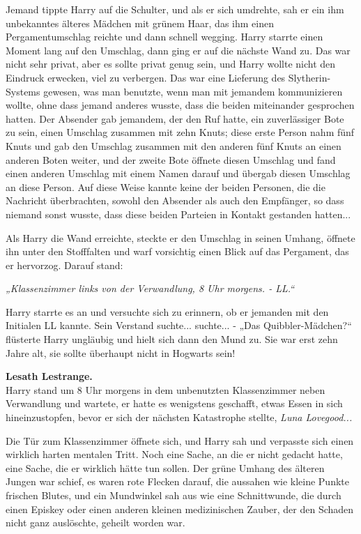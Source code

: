 {Jemand tippte Harry auf die Schulter, und als er sich umdrehte, sah er ein ihm unbekanntes älteres Mädchen mit grünem Haar, das ihm einen Pergamentumschlag reichte und dann schnell wegging. Harry starrte einen Moment lang auf den Umschlag, dann ging er auf die nächste Wand zu. Das war nicht sehr privat, aber es sollte privat genug sein, und Harry wollte nicht den Eindruck erwecken, viel zu verbergen. Das war eine Lieferung des Slytherin-Systems gewesen, was man benutzte, wenn man mit jemandem kommunizieren wollte, ohne dass jemand anderes wusste, dass die beiden miteinander gesprochen hatten. Der Absender gab jemandem, der den Ruf hatte, ein zuverlässiger Bote zu sein, einen Umschlag zusammen mit zehn Knuts; diese erste Person nahm fünf Knuts und gab den Umschlag zusammen mit den anderen fünf Knuts an einen anderen Boten weiter, und der zweite Bote öffnete diesen Umschlag und fand einen anderen Umschlag mit einem Namen darauf und übergab diesen Umschlag an diese Person. Auf diese Weise kannte keine der beiden Personen, die die Nachricht überbrachten, sowohl den Absender als auch den Empfänger, so dass niemand sonst wusste, dass diese beiden Parteien in Kontakt gestanden hatten...

Als Harry die Wand erreichte, steckte er den Umschlag in seinen Umhang, öffnete ihn unter den Stofffalten und warf vorsichtig einen Blick auf das Pergament, das er hervorzog. Darauf stand:

\emph{„Klassenzimmer links von der Verwandlung, 8 Uhr morgens. - LL.“}

Harry starrte es an und versuchte sich zu erinnern, ob er jemanden mit den Initialen LL kannte. Sein Verstand suchte... suchte... - „Das Quibbler-Mädchen?“ flüsterte Harry ungläubig und hielt sich dann den Mund zu. Sie war erst zehn Jahre alt, sie sollte überhaupt nicht in Hogwarts sein!

\textbf{Lesath Lestrange.}\\ Harry stand um 8 Uhr morgens in dem unbenutzten Klassenzimmer neben Verwandlung und wartete, er hatte es wenigstens geschafft, etwas Essen in sich hineinzustopfen, bevor er sich der nächsten Katastrophe stellte, \emph{Luna Lovegood...}

Die Tür zum Klassenzimmer öffnete sich, und Harry sah und verpasste sich einen wirklich harten mentalen Tritt. Noch eine Sache, an die er nicht gedacht hatte, eine Sache, die er wirklich hätte tun sollen. Der grüne Umhang des älteren Jungen war schief, es waren rote Flecken darauf, die aussahen wie kleine Punkte frischen Blutes, und ein Mundwinkel sah aus wie eine Schnittwunde, die durch einen Episkey oder einen anderen kleinen medizinischen Zauber, der den Schaden nicht ganz auslöschte, geheilt worden war.

}
